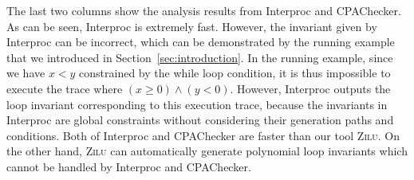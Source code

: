 The last two columns show the analysis results from Interproc and CPAChecker. 
As can be seen, Interproc is extremely fast. 
However, the invariant given by Interproc can be incorrect, 
which can be demonstrated by the running example 
that we introduced in Section~\ref{sec:introduction}. 
In the running example, since we have $x < y$ constrained by the while loop condition, 
it is thus impossible to execute the trace where $(x \ge 0) \land (y < 0)$. 
However, Interproc outputs the loop invariant corresponding to this execution trace, 
because the invariants in Interproc are global constraints 
without considering their generation paths and conditions. 
Both of Interproc and CPAChecker are faster than our tool \textsc{Zilu}. 
On the other hand, \textsc{Zilu} can automatically generate polynomial loop invariants 
which cannot be handled by Interproc and CPAChecker. 

